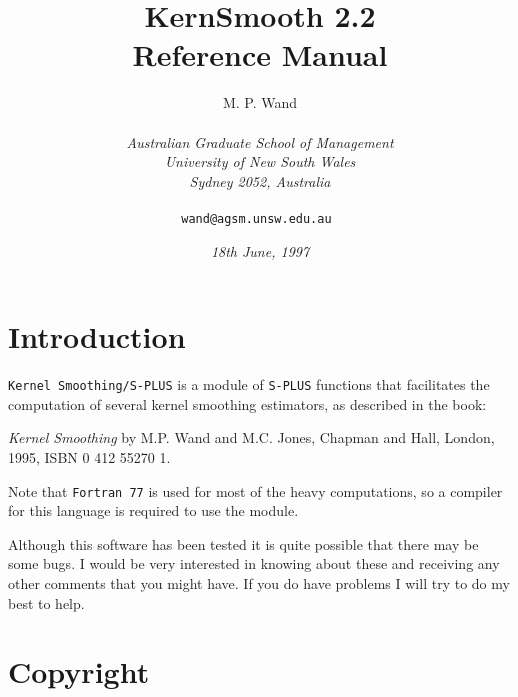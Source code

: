 %
\setlength{\oddsidemargin}{0in}
\setlength{\evensidemargin}{0in}
\setlength{\textwidth}{6.5in}
\setlength{\topmargin}{-0.6in}
\setlength{\textheight}{8.9in}
\def\jump{\vskip2mm\noindent}
\parindent=0pt
\parskip=10pt

%
%
%
%
\title{\bf KernSmooth 2.2\\ Reference Manual}
\author{M. P. Wand
\\
\\ {\em Australian Graduate School of Management}
\\ {\em University of New South Wales}
\\ {\em Sydney 2052, Australia}
\\
\\ {\tt wand@agsm.unsw.edu.au }}
\date{\sl 18th June, 1997}
\maketitle

\section*{\sc Introduction}
%
{\tt Kernel Smoothing/S-PLUS} is a module of {\tt S-PLUS} functions 
that facilitates the computation of several kernel smoothing estimators, 
as described in the book: 

{\it Kernel Smoothing} by M.P. Wand and M.C. Jones,
Chapman and Hall, London, 1995, ISBN 0 412 55270 1.  

Note that {\tt Fortran 77} is used for
most of the heavy computations, so a compiler for this language is
required to use the module. 

Although this software has been tested it is quite possible that there may be
some bugs. I would be very interested in knowing about these and receiving
any other comments that you might have. If you do have problems I will try to
do my best to help.
%



\section*{\sc Copyright}

